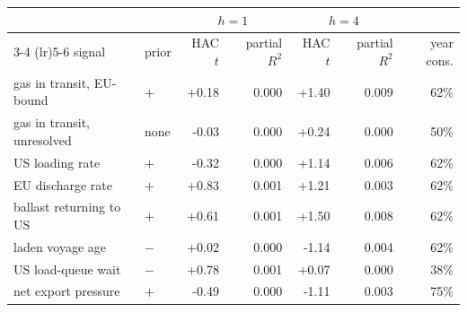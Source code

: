 \begin{tabular}{llrrrrr}
\toprule
 & & \multicolumn{2}{c}{$h=1$} & \multicolumn{2}{c}{$h=4$} & \\
\cmidrule(lr){3-4} \cmidrule(lr){5-6}
signal & prior & HAC $t$ & partial $R^2$ & HAC $t$ & partial $R^2$ & year cons. \\
\midrule
  gas in transit, EU-bound & $+$ & +0.18 & 0.000 & +1.40 & 0.009 & 62\% \\
  gas in transit, unresolved & none & -0.03 & 0.000 & +0.24 & 0.000 & 50\% \\
  US loading rate & $+$ & -0.32 & 0.000 & +1.14 & 0.006 & 62\% \\
  EU discharge rate & $+$ & +0.83 & 0.001 & +1.21 & 0.003 & 62\% \\
  ballast returning to US & $+$ & +0.61 & 0.001 & +1.50 & 0.008 & 62\% \\
  laden voyage age & $-$ & +0.02 & 0.000 & -1.14 & 0.004 & 62\% \\
  US load-queue wait & $-$ & +0.78 & 0.001 & +0.07 & 0.000 & 38\% \\
  net export pressure & $+$ & -0.49 & 0.000 & -1.11 & 0.003 & 75\% \\
\bottomrule
\end{tabular}
